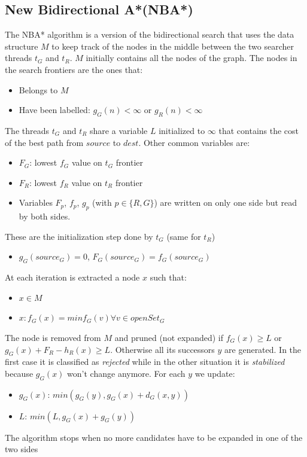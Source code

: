 \documentclass[twocolumn, switch]{article} %
\begin{document}
\subsection{New Bidirectional A*(NBA*)}
The NBA* algorithm is a version of  the bidirectional search that uses the data
structure $M$ to keep track of the nodes in the middle between the two searcher
threads $t_G$ and $t_R$. $M$ initially contains all the nodes of the graph. The nodes
in the search frontiers are the ones that:
\begin{itemize}
  \item Belongs to $M$
  \item Have been labelled: $g_G(n) < \infty $ or $g_R(n) < \infty $
\end{itemize}
The threads $t_G$ and $t_R$ share a variable $L$ initialized to $\infty$ that contains
the cost of the best path from $source$ to $dest$. Other common variables are:
\begin{itemize}
  \item $F_G$: lowest $f_G$ value on $t_G$ frontier
  \item $F_R$: lowest $f_R$ value on $t_R$ frontier
  \item Variables $F_p$, $f_p$, $g_p$ (with $p \in \{R,G\}$) are written on only one
        side but read by both sides.
\end{itemize}
These are the initialization step done by $t_G$ (same for $t_R$)
\begin{itemize}
  \item $g_G(source_G)=0$, $F_G(source_G)=f_G(source_G)$
\end{itemize}
At each iteration is extracted a node $x$ such that:
\begin{itemize}
  \item $x \in M$
  \item $x: f_G(x) = min f_G(v) \forall v \in openSet_G$ 
\end{itemize}
The node is removed from $M$ and pruned (not expanded) if $f_G(x) \ge L$ or
$g_G(x)+F_R-h_R(x) \ge L$. Otherwise all its successors $y$ are generated. In the
first case it is classified as \textit{rejected} while in the other situation it is
\textit{stabilized} because $g_G(x)$ won't change anymore. For each $y$ we update:
\begin{itemize}
  \item $g_G(x)$: $min(g_G(y), g_G(x) + d_G(x, y))$
  \item $L$: $min(L, g_G(x) + g_G(y))$
\end{itemize}
The algorithm stops when no more candidates have to be expanded in one of the two sides
\end{document}
